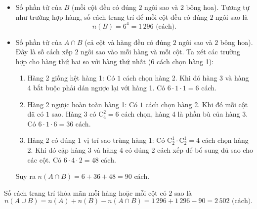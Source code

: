 \begin{ex}
{\begin{itemize}
			Mỗi hàng có $4$ ô vuông, số cách chọn $2$ ô để dán ngôi sao là $C_4^2 = 6$ cách. \\
			Vì bảng có $4$ hàng động độc lập với nhau, nên số cách trang trí để mỗi hàng đều có $2$ ngôi sao là
			\[n(A) = 6 \cdot 6 \cdot 6 \cdot 6 = 6^4 = 1\,296 \text{ (cách).}\]
			\item Số phần tử của $B$ (mỗi cột đều có đúng $2$ ngôi sao và $2$ bông hoa).
			Tương tự như trường hợp hàng, số cách trang trí để mỗi cột đều có đúng $2$ ngôi sao là\\
			\[n(B) = 6^4 = 1\,296 \text{ (cách).}\]
			\item Số phần tử của  $A \cap B$ (cả cột và hàng đều có đúng $2$ ngôi sao và $2$ bông hoa). \\
			Đây là số cách xếp $2$ ngôi sao vào mỗi hàng và mỗi cột. Ta xét các trường hợp cho hàng thứ hai so với hàng thứ nhất ($6$ cách chọn hàng 1):
			\begin{enumerate}[\it TH1: ]
				\item Hàng 2 giống hệt hàng 1: Có $1$ cách chọn hàng 2. Khi đó hàng 3 và hàng 4 bắt buộc phải dán ngược lại với hàng 1. Có $6 \cdot 1 \cdot 1 = 6$ cách.
				\item Hàng 2 ngược hoàn toàn hàng 1: Có $1$ cách chọn hàng 2. Khi đó mỗi cột đã có $1$ sao. Hàng 3 có $\mathrm{C}_4^2=6$ cách chọn, hàng 4 là phần bù của hàng 3. Có $6 \cdot 1 \cdot 6 = 36$ cách.
				\item Hàng 2 có đúng $1$ vị trí sao trùng hàng 1: Có $\mathrm{C}_2^1 \cdot \mathrm{C}_2^1 = 4$ cách chọn hàng 2. Khi đó cặp hàng 3 và hàng 4 có đúng $2$ cách xếp để bổ sung đủ sao cho các cột. Có $6 \cdot 4 \cdot 2 = 48$ cách.
			\end{enumerate}
			Suy ra $n(A \cap B) = 6 + 36 + 48 = 90$ cách.
		\end{itemize}
		Số cách trang trí thỏa mãn mỗi hàng hoặc mỗi cột có $2$ sao là
		$$n(A\cup B) = n(A)+n(B)-n(A\cap B) = 1\,296 + 1\,296 - 90 = 2\,502 \text{ (cách).}$$
	}
\end{ex}

